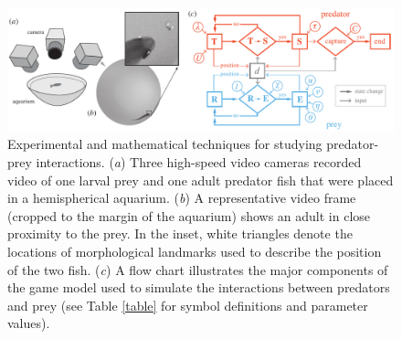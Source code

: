 \documentclass[]{rsos}%
\begin{document}
\pagebreak

\linespread{1}\selectfont %


\begin{figure}[!h]
\centering\includegraphics[width=5.5in]{fig1}
\caption{Experimental and mathematical techniques for studying predator-prey interactions. (\textit{a}) Three high-speed video cameras recorded video of one larval prey and one adult predator fish that were placed in a hemispherical aquarium. (\textit{b}) A representative video frame (cropped to the margin of the aquarium) shows an adult in close proximity to the prey. In the inset, white triangles denote the locations of morphological landmarks used to describe the position of the two fish. (\textit{c}) A flow chart illustrates the major components of the game model used to simulate the interactions between predators and prey (see Table \ref{table} for symbol definitions and parameter values).}
\label{fig_setup}
\end{figure}

\pagebreak
\end{document}
